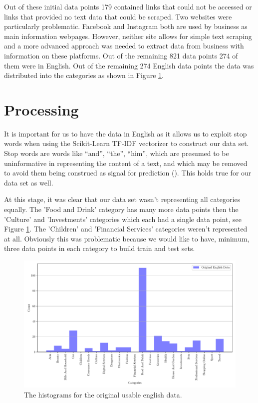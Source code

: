Out of these initial data points 179 contained links that could not be accessed or links that provided no text data that could be scraped. Two websites were particularly problematic. Facebook and Instagram both are used by business as main information webpages. However, neither site allows for simple text scraping and a more advanced approach was needed to extract data from business with information on these platforms. Out of the remaining 821 data points 274 of them were in English. Out of the remaining 274 English data points the data was distributed into the categories as shown in Figure \ref{fig:original_english_counts}.

\section{Processing}

It is important for us to have the data in English as it allows us to exploit stop words when using the Scikit-Learn TF-IDF vectorizer to construct our data set. Stop words are words like “and”, “the”, “him”, which are presumed to be uninformative in representing the content of a text, and which may be removed to avoid them being construed as signal for prediction (\cite{sklearn62feature}). This holds true for our data set as well.

At this stage, it was clear that our data set wasn't representing all categories equally. The 'Food and Drink' category has many more data points then the 'Culture' and 'Investments' categories which each had a single data point, see Figure \ref{fig:original_english_counts}. The 'Children' and 'Financial Services' categories weren't represented at all. Obviously this was problematic because we would like to have, minimum, three data points in each category to build train and test sets.

\begin{figure}[!ht]
  \centering
  \includegraphics[width=\textwidth]{../img/plot_original_english_counts.pdf}
  \caption{The histograms for the original usable english data.}
  \label{fig:original_english_counts}
\end{figure}

